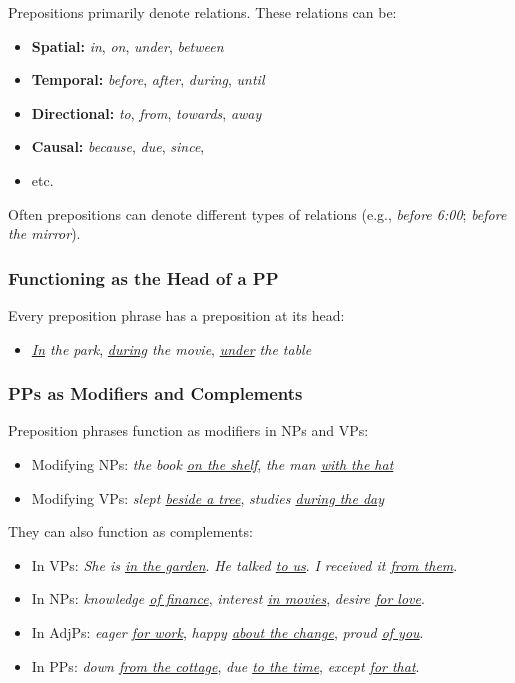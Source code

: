 Prepositions primarily denote relations. These relations can be:

\begin{itemize}
   \item \textbf{Spatial:} \textit{in}, \textit{on}, \textit{under}, \textit{between}
   \item \textbf{Temporal:} \textit{before}, \textit{after}, \textit{during}, \textit{until}
   \item \textbf{Directional:} \textit{to}, \textit{from}, \textit{towards}, \textit{away}
   \item \textbf{Causal:} \textit{because}, \textit{due}, \textit{since},
   \item etc.
\end{itemize}

\noindent Often prepositions can denote different types of relations (e.g., \textit{before 6:00}; \textit{before the mirror}).

\subsubsection*{Functioning as the Head of a PP}

Every preposition phrase has a preposition at its head:

\begin{itemize}
   \item \textit{\uline{In} the park}, \textit{\uline{during} the movie}, \textit{\uline{under} the table}
\end{itemize}

\subsubsection*{PPs as Modifiers and Complements}

Preposition phrases function as modifiers in NPs and VPs:

\begin{itemize}
   \item Modifying NPs: \textit{the book \uline{on the shelf}}, \textit{the man \uline{with the hat}}
   \item Modifying VPs: \textit{slept \uline{beside a tree}}, \textit{studies \uline{during the day}}
\end{itemize}

They can also function as complements:

\begin{itemize}
   \item In VPs: \textit{She is \uline{in the garden}}. \textit{He talked \uline{to us}}. \textit{I received it \uline{from them}}. 
   \item In NPs: \textit{knowledge \uline{of finance}}, \textit{interest \uline{in movies}}, \textit{desire \uline{for love}}.
   \item In AdjPs: \textit{eager \uline{for work}}, \textit{happy \uline{about the change}}, \textit{proud \uline{of you}}.
   \item In PPs: \textit{down \uline{from the cottage}}, \textit{due \uline{to the time}}, \textit{except \uline{for that}}.
\end{itemize}

